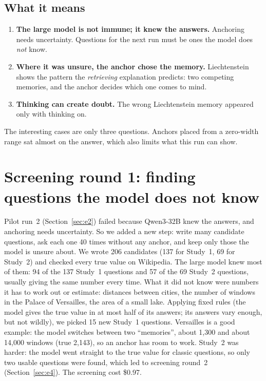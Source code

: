 \documentclass[11pt,a4paper]{article}
\begin{document}
\subsection{What it means}
\begin{enumerate}[leftmargin=*]
  \item \textbf{The large model is not immune; it knew the answers.} Anchoring needs uncertainty. Questions for the next run must be ones the model does \emph{not} know.
  \item \textbf{Where it was unsure, the anchor chose the memory.} Liechtenstein shows the pattern the \emph{retrieving} explanation predicts: two competing memories, and the anchor decides which one comes to mind.
  \item \textbf{Thinking can create doubt.} The wrong Liechtenstein memory appeared only with thinking on.
\end{enumerate}

\begin{cautionbox}[Limits.]
The interesting cases are only three questions. Anchors placed from a zero-width range sat almost on the answer, which also limits what this run can show.
\end{cautionbox}

\section{Screening round 1: finding questions the model does not know}
\label{sec:e3}

\begin{inshort}
Pilot run~2 (Section~\ref{sec:e2}) failed because Qwen3-32B knew the answers, and anchoring needs uncertainty. So we added a new step: write many candidate questions, ask each one 40 times without any anchor, and keep only those the model is unsure about. We wrote 206 candidates (137 for Study~1, 69 for Study~2) and checked every true value on Wikipedia. The large model knew most of them: 94 of the 137 Study~1 questions and 57 of the 69 Study~2 questions, usually giving the same number every time. What it did not know were numbers it has to work out or estimate: distances between cities, the number of windows in the Palace of Versailles, the area of a small lake. Applying fixed rules (the model gives the true value in at most half of its answers; its answers vary enough, but not wildly), we picked 15 new Study~1 questions. Versailles is a good example: the model switches between two \enquote{memories}, about 1,300 and about 14,000 windows (true 2,143), so an anchor has room to work. Study~2 was harder: the model went straight to the true value for classic questions, so only two usable questions were found, which led to screening round~2 (Section~\ref{sec:e4}). The screening cost \$0.97.
\end{inshort}
\end{document}
